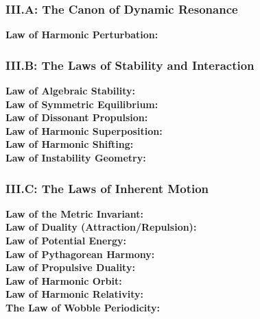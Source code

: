 \subsubsection*{III.A: The Canon of Dynamic Resonance}
\begin{description}
    \item[\bfseries Law of Harmonic Perturbation:] 
\end{description}

\subsubsection*{III.B: The Laws of Stability and Interaction}
\begin{description}
    \item[\bfseries Law of Algebraic Stability:] 
    \item[\bfseries Law of Symmetric Equilibrium:] 
    \item[\bfseries Law of Dissonant Propulsion:] 
    \item[\bfseries Law of Harmonic Superposition:] 
    \item[\bfseries Law of Harmonic Shifting:] 
    \item[\bfseries Law of Instability Geometry:] 
\end{description}

\subsubsection*{III.C: The Laws of Inherent Motion}
\begin{description}
    \item[\bfseries Law of the Metric Invariant:] 
    \item[\bfseries Law of Duality (Attraction/Repulsion):] 
    \item[\bfseries Law of Potential Energy:] 
    \item[\bfseries Law of Pythagorean Harmony:] 
    \item[\bfseries Law of Propulsive Duality:] 
    \item[\bfseries Law of Harmonic Orbit:] 
    \item[\bfseries Law of Harmonic Relativity:] 
    \item[\bfseries The Law of Wobble Periodicity:] 
\end{description}

